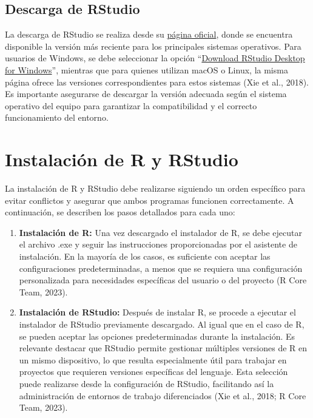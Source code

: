 \documentclass[
  spanish,
  letterpaper,
]{book}
\begin{document}
\subsection{Descarga de RStudio}\label{descarga-de-rstudio}

La descarga de RStudio se realiza desde su
\href{https://posit.co/download/rstudio-desktop/}{página oficial}, donde
se encuentra disponible la versión más reciente para los principales
sistemas operativos. Para usuarios de Windows, se debe seleccionar la
opción
``\href{https://download1.rstudio.org/electron/windows/RStudio-2025.05.0-496.exe}{Download
RStudio Desktop for Windows}'', mientras que para quienes utilizan macOS
o Linux, la misma página ofrece las versiones correspondientes para
estos sistemas (Xie et al., 2018). Es importante asegurarse de descargar
la versión adecuada según el sistema operativo del equipo para
garantizar la compatibilidad y el correcto funcionamiento del entorno.

\section{Instalación de R y
RStudio}\label{instalaciuxf3n-de-r-y-rstudio}

La instalación de R y RStudio debe realizarse siguiendo un orden
específico para evitar conflictos y asegurar que ambos programas
funcionen correctamente. A continuación, se describen los pasos
detallados para cada uno:

\begin{enumerate}
\def\labelenumi{\arabic{enumi}.}
\item
  \textbf{Instalación de R:} Una vez descargado el instalador de R, se
  debe ejecutar el archivo .exe y seguir las instrucciones
  proporcionadas por el asistente de instalación. En la mayoría de los
  casos, es suficiente con aceptar las configuraciones predeterminadas,
  a menos que se requiera una configuración personalizada para
  necesidades específicas del usuario o del proyecto (R Core Team,
  2023).
\item
  \textbf{Instalación de RStudio:} Después de instalar R, se procede a
  ejecutar el instalador de RStudio previamente descargado. Al igual que
  en el caso de R, se pueden aceptar las opciones predeterminadas
  durante la instalación. Es relevante destacar que RStudio permite
  gestionar múltiples versiones de R en un mismo dispositivo, lo que
  resulta especialmente útil para trabajar en proyectos que requieren
  versiones específicas del lenguaje. Esta selección puede realizarse
  desde la configuración de RStudio, facilitando así la administración
  de entornos de trabajo diferenciados (Xie et al., 2018; R Core Team,
  2023).
\end{enumerate}
\end{document}
